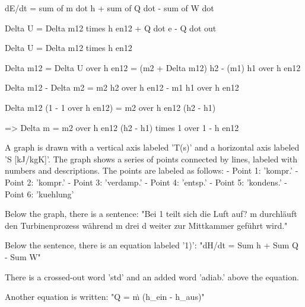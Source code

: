 dE/dt = sum of m dot h + sum of Q dot - sum of W dot

Delta U = Delta m12 times h en12 + Q dot e - Q dot out

Delta U = Delta m12 times h en12

Delta m12 = Delta U over h en12 = (m2 + Delta m12) h2 - (m1) h1 over h en12

Delta m12 - Delta m2 = m2 h2 over h en12 - m1 h1 over h en12

Delta m12 (1 - 1 over h en12) = m2 over h en12 (h2 - h1) 

=> Delta m = m2 over h en12 (h2 - h1) times 1 over 1 - h en12

A graph is drawn with a vertical axis labeled 'T(s)' and a horizontal axis labeled 'S [kJ/kgK]'. The graph shows a series of points connected by lines, labeled with numbers and descriptions. The points are labeled as follows:
- Point 1: 'kompr.'
- Point 2: 'kompr.'
- Point 3: 'verdamp.'
- Point 4: 'entsp.'
- Point 5: 'kondens.'
- Point 6: 'kuehlung'

Below the graph, there is a sentence: "Bei 1 teilt sich die Luft auf? m durchläuft den Turbinenprozess während m drei d weiter zur Mittkammer geführt wird."

Below the sentence, there is an equation labeled '1)': "dH/dt = Sum h + Sum Q - Sum W"

There is a crossed-out word 'std' and an added word 'adiab.' above the equation.

Another equation is written: "Q = ṁ (h_ein - h_aus)"